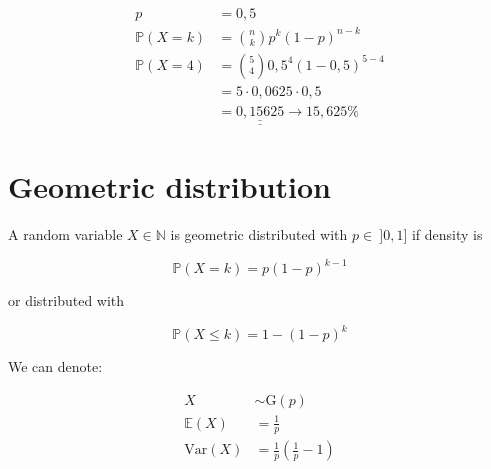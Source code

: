 \documentclass[twoside, a4paper, twocolumn]{article}
\begin{document}
    \begin{align*}
        p &= 0,5 \\
        \mathbb{P}(X = k) &= \binom{n}{k}p^k(1-p)^{n-k} \\
        \mathbb{P}(X = 4) &= \binom{5}{4}0,5^4(1-0,5)^{5-4} \\
                          &= 5 \cdot 0,0625 \cdot 0,5 \\
                          &= \underline{\underline{0,15625}} \rightarrow 15,625\%
    \end{align*}


    \section{Geometric distribution}

    A random variable $X \in \mathbb{N}$ is geometric distributed with $p \in \
    ]0,1]$ if density is

    \begin{equation}
        \mathbb{P}(X = k) = p (1-p)^{k-1}
    \end{equation}

    or distributed with

    \begin{equation}
        \mathbb{P}(X \leq k) = 1 - (1 - p)^k
    \end{equation}

    We can denote:

    \begin{align}
        X &\sim \textrm{G}(p) \\
        \mathbb{E}(X) &= \frac{1}{p} \\
        \textrm{Var}(X) &= \frac{1}{p}\left(\frac{1}{p}-1\right)
    \end{align}
\end{document}
